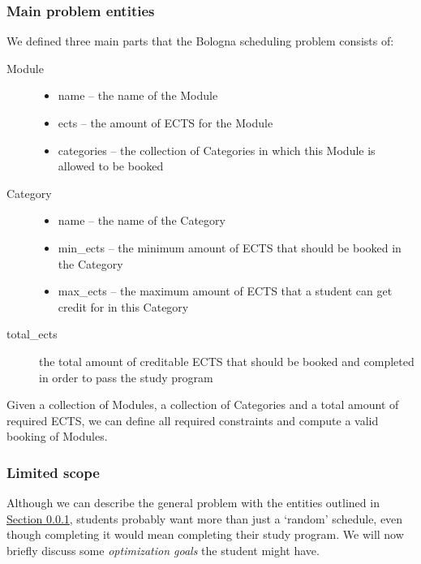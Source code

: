 \documentclass[a4paper]{article}
\begin{document}
\subsubsection{Main problem entities}
\label{sec:problem-parts}
We defined three main parts that the Bologna scheduling problem consists of:
\begin{description}
	\item[Module] \hspace*{1em}
	\begin{itemize}
		\item name -- the name of the Module
		\item ects -- the amount of ECTS for the Module
		\item categories -- the collection of Categories in which this Module is allowed to be booked
	\end{itemize}

	\item[Category] \hspace*{1em}
	\begin{itemize}
		\item name -- the name of the Category
		\item min\_ects -- the minimum amount of ECTS that should be booked in the Category
		\item max\_ects -- the maximum amount of ECTS that a student can get credit for in this Category
	\end{itemize}

	\item[total\_ects] the total amount of creditable ECTS that should be booked and completed in order to pass the study program
\end{description}
Given a collection of Modules, a collection of Categories and a total amount of required ECTS, we can define all required constraints and compute a valid booking of Modules.


\subsubsection{Limited scope}
\label{sec:problem-scope}
Although we can describe the general problem with the entities outlined in 
\hyperref[sec:problem-parts]{Section \ref*{sec:problem-parts}}, 
students probably want more than just a `random' schedule, even though completing it would mean completing their study program.
We will now briefly discuss some \emph{optimization goals} the student might have. 
\end{document}
